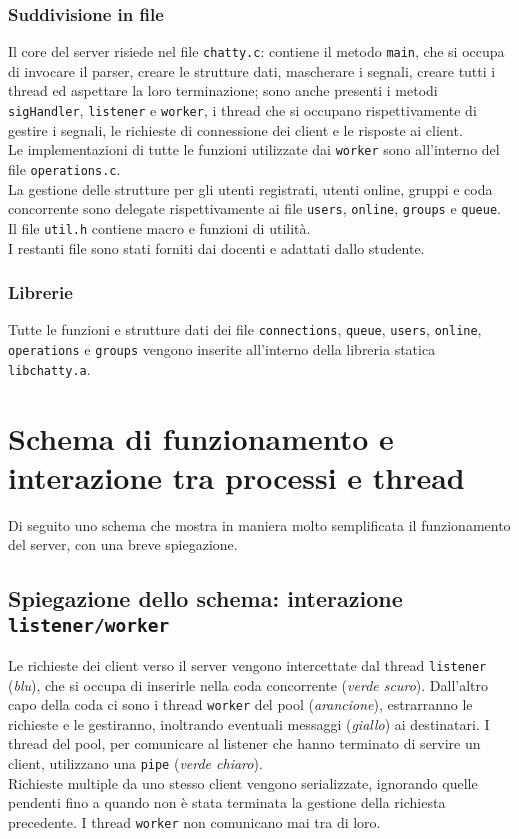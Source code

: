 \subsubsection{Suddivisione in file}
Il core del server risiede nel file \texttt{chatty.c}: contiene il metodo \texttt{main}, che si occupa di invocare il parser, creare le strutture dati, mascherare i segnali, creare tutti i thread ed aspettare la loro terminazione; sono anche presenti i metodi \texttt{sigHandler}, \texttt{listener} e \texttt{worker}, i thread che si occupano rispettivamente di gestire i segnali, le richieste di connessione dei client e le risposte ai client.\\
Le implementazioni di tutte le funzioni utilizzate dai \texttt{worker} sono all'interno del file \texttt{operations.c}.\\
La gestione delle strutture per gli utenti registrati, utenti online, gruppi e coda concorrente sono delegate rispettivamente ai file \texttt{users}, \texttt{online}, \texttt{groups} e \texttt{queue}.\\
Il file \texttt{util.h} contiene macro e funzioni di utilità.\\
I restanti file sono stati forniti dai docenti e adattati dallo studente.

\subsubsection{Librerie}
Tutte le funzioni e strutture dati dei file \texttt{connections}, \texttt{queue}, \texttt{users}, \texttt{online}, \texttt{operations} e \texttt{groups} vengono inserite all'interno della libreria statica \texttt{libchatty.a}.


\section{Schema di funzionamento e interazione tra processi e thread}
Di seguito uno schema che mostra in maniera molto semplificata il funzionamento del server, con una breve spiegazione.\\

\subsection{Spiegazione dello schema: interazione \texttt{listener/worker}}
Le richieste dei client verso il server vengono intercettate dal thread \texttt{listener} (\textit{blu}), che si occupa di inserirle nella coda concorrente (\textit{verde scuro}). Dall'altro capo della coda ci sono i thread \texttt{worker} del pool (\textit{arancione}), estrarranno le richieste e le gestiranno, inoltrando eventuali messaggi (\textit{giallo}) ai destinatari. I thread del pool, per comunicare al listener che hanno terminato di servire un client, utilizzano una \texttt{pipe} (\textit{verde chiaro}).\\
Richieste multiple da uno stesso client vengono serializzate, ignorando quelle pendenti fino a quando non è stata terminata la gestione della richiesta precedente. I thread \texttt{worker} non comunicano mai tra di loro.

